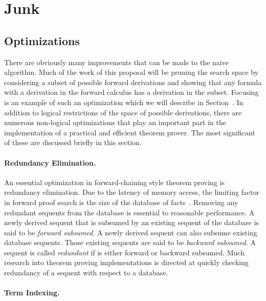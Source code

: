 
\section{Junk}

\subsection{Optimizations}

  There are obviously many improvements that can be made to the naive
algorithm.  Much of the work of this proposal will be pruning the
search space by considering a subset of possible forward derivations
and showing that any formula with a derivation in the forward calculus
has a derivation in the subset.  Focusing is an example of such an
optimization which we will describe in Section~.  In
addition to logical restrictions of the space of possible derivations,
there are numerous non-logical optimizations that play an important
part in the implementation of a practical and efficient theorem
prover.  The most significant of these are discussed briefly in this
section.

\paragraph{Redundancy Elimination.}

  An essential optimization in forward-chaining style theorem proving
is redundancy elimination.  Due to the latency of memory access, the
limiting factor in forward proof search is the size of the database of
facts~\cite{Voronkov.2001.Indexing}.  Removing any redundant
sequents from the database is essential to reasonable performance.  A
newly derived sequent that is subsumed by an existing sequent of the
database is said to be \emph{forward subsumed}.  A newly derived
sequent can also subsume existing database sequents.  Those existing
sequents are said to be \emph{backward subsumed}.  A sequent is called
\emph{redundant} if is either forward or backward subsumed.  Much
research into theorem proving implementations is directed at quickly
checking redundancy of a sequent with respect to a database.

\paragraph{Term Indexing.}

